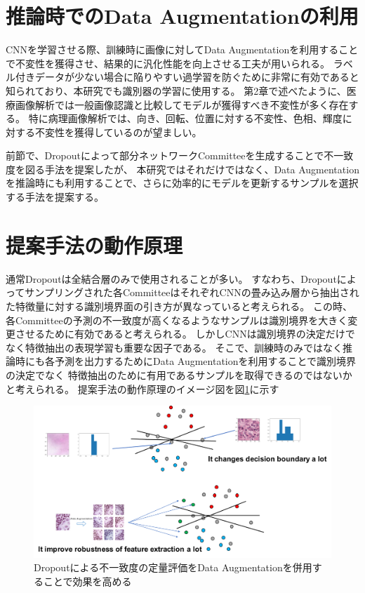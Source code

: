 \section{推論時でのData Augmentationの利用}
CNNを学習させる際、訓練時に画像に対してData Augmentationを利用することで不変性を獲得させ、結果的に汎化性能を向上させる工夫が用いられる。
ラベル付きデータが少ない場合に陥りやすい過学習を防ぐために非常に有効であると知られており、本研究でも識別器の学習に使用する。
第2章で述べたように、医療画像解析では一般画像認識と比較してモデルが獲得すべき不変性が多く存在する。
特に病理画像解析では、向き、回転、位置に対する不変性、色相、輝度に対する不変性を獲得しているのが望ましい。

前節で、Dropoutによって部分ネットワークCommitteeを生成することで不一致度を図る手法を提案したが、
本研究ではそれだけではなく、Data Augmentationを推論時にも利用することで、さらに効率的にモデルを更新するサンプルを選択する手法を提案する。

\section{提案手法の動作原理}
通常Dropoutは全結合層のみで使用されることが多い。
すなわち、Dropoutによってサンプリングされた各CommitteeはそれぞれCNNの畳み込み層から抽出された特徴量に対する識別境界面の引き方が異なっていると考えられる。
この時、各Committeeの予測の不一致度が高くなるようなサンプルは識別境界を大きく変更させるために有効であると考えられる。
しかしCNNは識別境界の決定だけでなく特徴抽出の表現学習も重要な因子である。
そこで、訓練時のみではなく推論時にも各予測を出力するためにData Augmentationを利用することで識別境界の決定でなく
特徴抽出のために有用であるサンプルを取得できるのではないかと考えられる。
提案手法の動作原理のイメージ図を図\ref{fig:how_it_works}に示す


\begin{figure}[tbp]
     \begin{center}
      \includegraphics[width=120mm]{figures/how_it_works.pdf}
     \end{center}
    \caption{\label{fig:how_it_works}Dropoutによる不一致度の定量評価をData Augmentationを併用することで効果を高める}
\end{figure}


